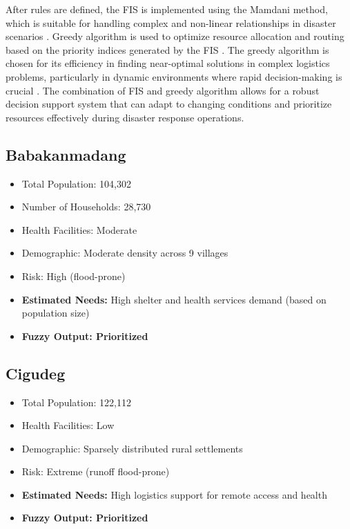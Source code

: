 \documentclass[conference,final,a4paper,twoside,10pt]{IEEEtran}
\begin{document}
After rules are defined, the FIS is implemented using the Mamdani method, which is suitable for handling complex and non-linear relationships in disaster scenarios \cite{herpratiwi2022implementation}. Greedy algorithm is used to optimize resource allocation and routing based on the priority indices generated by the FIS \cite{shirmarz2020adaptive}. The greedy algorithm is chosen for its efficiency in finding near-optimal solutions in complex logistics problems, particularly in dynamic environments where rapid decision-making is crucial \cite{hamidouglu2023game}. The combination of FIS and greedy algorithm allows for a robust decision support system that can adapt to changing conditions and prioritize resources effectively during disaster response operations. 

\subsection*{Babakanmadang}
\begin{itemize}
    \item Total Population: 104,302
    \item Number of Households: 28,730
    \item Health Facilities: Moderate
    \item Demographic: Moderate density across 9 villages
    \item Risk: High (flood-prone)
    \item \textbf{Estimated Needs:} High shelter and health services demand (based on population size)
    \item \textbf{Fuzzy Output: Prioritized}
\end{itemize}
\subsection*{Cigudeg}
\begin{itemize}
    \item Total Population: 122,112
    \item Health Facilities: Low
    \item Demographic: Sparsely distributed rural settlements
    \item Risk: Extreme (runoff flood-prone)
    \item \textbf{Estimated Needs:} High logistics support for remote access and health
    \item \textbf{Fuzzy Output: Prioritized}
\end{itemize}
\end{document}

